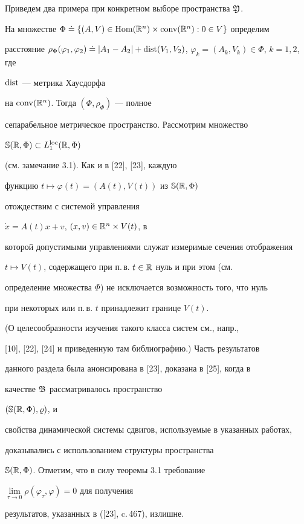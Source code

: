 Приведем два примера при конкретном выборе пространства $\frak Y$.








\begin{exams} 


На множестве $\Phi\doteq\{(A,V)\in\Hom(\Bbb R^n)


\times\conv(\Bbb R^n):0\in V\}$ определим


расстояние $\rho_\Phi(\varphi_1,\varphi_2)\doteq|A_1-A_2|


+\dist(V_1,V_2)$, $\varphi_k=(A_k,V_k)\in\Phi$, $k=1,2$, где


$\operatorname{dist}$ --- метрика Хаусдорфа


на $\operatorname{conv}(\Bbb R^n)$. Тогда $(\Phi,\rho_{\Phi})$ --- полное


сепарабельное метрическое пространство. Рассмотрим множество


$\Bbb S(\Bbb R,\Phi)\subset L_1^{\operatorname{loc}}(\Bbb R,\Phi)$


(см. замечание 3.1). Как и в [22], [23], каждую


функцию $t\mapsto\varphi(t)=(A(t),V(t))$ из $\Bbb S(\Bbb R,\Phi)$


отождествим с системой управления


$\Dot x=A(t)x+v$, $(x,v)\in\Bbb R^n\times V(t)$, в


которой допустимыми управлениями служат измеримые сечения отображения


$t\mapsto V(t)$, содержащего при п.\,в. $t\in\Bbb R$ нуль и при этом (см.


определение множества $\Phi$) не исключается возможность того, что нуль


при некоторых или п.\,в. $t$ принадлежит границе $V(t)$.


(О целесообразности изучения такого класса систем см., напр.,


[10], [22], [24] и приведенную там библиографию.) Часть результатов


данного раздела была анонсирована в [23], доказана в [25], когда в


качестве $\frak B$ рассматривалось пространство


$(\Bbb S(\Bbb R,\Phi),\varrho)$, и


свойства динамической системы сдвигов, используемые в указанных работах,


доказывались с использованием структуры пространства


$\Bbb S(\Bbb R,\Phi)$. Отметим, что в силу теоремы 3.1 требование


$\lim\limits_{\tau\to 0}\rho(\varphi_{\tau},\varphi)=0$ для получения


результатов, указанных в ([23], c.\,467), излишне.


\end{exams}








